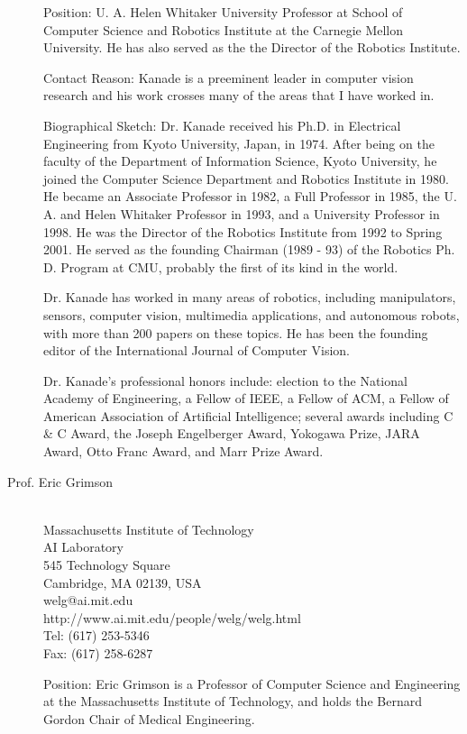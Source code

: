 \documentclass{gtcv}
\begin{document}
\begin{description}
\medskip

Position: U. A. Helen Whitaker University Professor at School of
Computer Science and Robotics Institute at the Carnegie Mellon
University.  He has also served as the the Director of the
Robotics Institute.

Contact Reason: Kanade is a preeminent leader in computer vision
research and his work crosses many of the areas that I have worked
in.

\smallskip
Biographical Sketch: Dr. Kanade received his Ph.D. in Electrical
Engineering from Kyoto University, Japan, in 1974. After being on
the faculty of the Department of Information Science, Kyoto
University, he joined the Computer Science Department and Robotics
Institute in 1980. He became an Associate Professor in 1982, a
Full Professor in 1985, the U. A. and Helen Whitaker Professor in
1993, and a University Professor in 1998. He was the Director of
the Robotics Institute from 1992 to Spring 2001. He served as the
founding Chairman (1989 - 93) of the Robotics Ph. D. Program at
CMU, probably the first of its kind in the world.

Dr. Kanade has worked in many areas of robotics, including
manipulators, sensors, computer vision, multimedia applications,
and autonomous robots, with more than 200 papers on these topics.
He has been the founding editor of the International Journal of
Computer Vision.

Dr. Kanade's professional honors include: election to the National
Academy of Engineering, a Fellow of IEEE, a Fellow of ACM, a
Fellow of American Association of Artificial Intelligence; several
awards including C \& C Award, the Joseph Engelberger Award,
Yokogawa Prize, JARA Award, Otto Franc Award, and Marr Prize
Award.



\item[Prof. Eric Grimson]~\\
Massachusetts Institute of Technology\\
AI Laboratory\\
545 Technology Square \\
Cambridge, MA 02139, USA \\
welg@ai.mit.edu \\
http://www.ai.mit.edu/people/welg/welg.html \\
Tel: (617) 253-5346\\
Fax: (617) 258-6287

\medskip
Position: Eric Grimson is a Professor of Computer Science and
Engineering at the Massachusetts Institute of Technology, and
holds the Bernard Gordon Chair of Medical Engineering.


\end{description}
\end{document}
